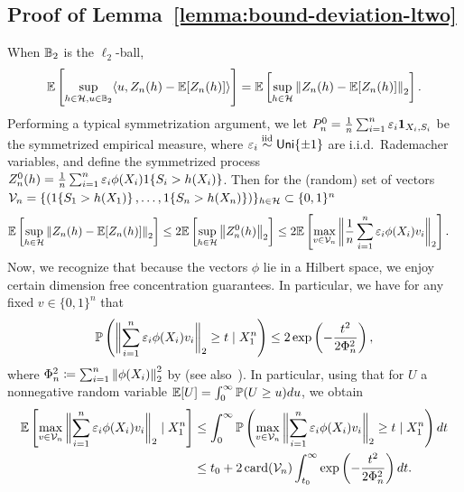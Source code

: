 \documentclass{article}
\newcommand{\scorerv}{S}
\begin{document}
\subsection{Proof of Lemma~\ref{lemma:bound-deviation-ltwo}}
\label{sec:proof-bound-deviation-ltwo}

When $\mathbb{B}_2$ is the $\ell_2$-ball,
\begin{equation*}
  \mathbb{E}\left[\sup_{h \in \mathcal{H}, u \in \mathbb{B}_2}
    \langle u, Z_n(h) - \mathbb{E}[Z_n(h)]\rangle\right]
  = \mathbb{E}\left[\sup_{h \in \mathcal{H}} \left\|{Z_n(h) - \mathbb{E}[Z_n(h)]}\right\|_2
    \right].
\end{equation*}
Performing a typical symmetrization argument, we let $P_n^0 = \frac{1}{n}
\sum_{i = 1}^n \varepsilon_i \pointmass_{X_i, \scorerv_i}$ be the
symmetrized empirical measure, where $\varepsilon_i \stackrel{\rm iid}{\sim} \mathsf{Uni}\{\pm
1\}$ are i.i.d.\ Rademacher variables, and define the symmetrized process
$Z_n^0(h) = \frac{1}{n} \sum_{i = 1}^n \varepsilon_i \phi(X_i)
\indic{\scorerv_i > h(X_i)}$.
%
Then for the (random) set of vectors
$\mc{V}_n = \{(\indic{\scorerv_1 > h(X_1)}, \ldots, \indic{\scorerv_n >
  h(X_n)})\}_{h \in \mc{H}} \subset \{0, 1\}^n$
\begin{align*}
  \mathbb{E}\left[\sup_{h \in \mathcal{H}} \left\|{Z_n(h) - \mathbb{E}[Z_n(h)]}\right\|_2 \right]
  & \le 2 \mathbb{E}\left[\sup_{h \in \mathcal{H}} \left\|{Z_n^0(h)}\right\|_2\right]
  \le 2 \mathbb{E}\left[\max_{v \in \mathcal{V}_n}
    \bigg\|{\frac{1}{n} \sum_{i = 1}^n \varepsilon_i \phi(X_i) v_i}\bigg\|_2\right].
\end{align*}
Now, we recognize that because the vectors $\phi$ lie in a Hilbert
space,
we enjoy certain dimension free concentration guarantees.
%
In particular, we have for any fixed $v \in \{0, 1\}^n$ that
\begin{equation*}
  \mathbb{P}\left(\bigg\|{\sum_{i = 1}^n \varepsilon_i \phi(X_i) v_i}\bigg\|_2 \ge t
  \mid X_1^n \right)
  \le 2 \exp\left(-\frac{t^2}{2 \Phi_n^2}\right),
\end{equation*}
where $\Phi_n^2 \coloneqq \sum_{i = 1}^n \left\|{\phi(X_i)}\right\|_2^2$ by
\citet[Theorem 3.5]{Pinelis94} (see also~\cite[Corollary
  10]{HowardRaMcSe20}).
%
In particular, using that for $U$ a nonnegative random variable
$\mathbb{E}[U] = \int_0^\infty \mathbb{P}(U \ge u) du$,
we obtain
\begin{align*}
  \mathbb{E}\left[\max_{v \in \mathcal{V}_n} \bigg\|{\sum_{i = 1}^n
      \varepsilon_i \phi(X_i) v_i}\bigg\|_2
    \mid X_1^n \right]
  & \le \int_0^\infty \mathbb{P}
  \left(\max_{v \in \mathcal{V}_n}
  \bigg\|{\sum_{i = 1}^n
    \varepsilon_i \phi(X_i) v_i}\bigg\|_2 \ge t \mid X_1^n \right) dt \\
  & \le t_0
  + 2 \mathop{\rm card}(\mathcal{V}_n) \int_{t_0}^\infty
  \exp\left(-\frac{t^2}{2 \Phi_n^2}\right) dt.
\end{align*}
\end{document}
